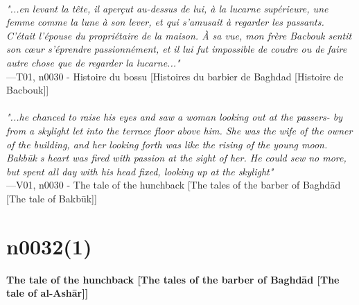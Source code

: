 \documentclass[../Carre_nights.tex]{subfiles}
\begin{document}
\textit{\\
"...en levant la tête, il aperçut au-dessus de lui, à la lucarne supérieure, une femme comme la lune à son lever, et qui s’amusait à regarder les passants. C’était l’épouse du propriétaire de la maison. À sa vue, mon frère Bacbouk sentit son cœur s’éprendre passionnément, et il lui fut impossible de coudre ou de faire autre chose que de regarder la lucarne..."} \\
—T01, n0030 - Histoire du bossu [Histoires du barbier de Baghdad [Histoire de Bacbouk]] \\~\\
\textit{"...he chanced to raise his eyes and saw a woman looking out at the passers- by from a skylight let into the terrace floor above him. She was the wife of the owner of the building, and her looking forth was like the rising of the young moon. Bakb\=uk s heart was fired with passion at the sight of her. He could sew no more, but spent all day with his head fixed, looking up at the skylight"} \\
—V01, n0030 - The tale of the hunchback [The tales of the barber of Baghd\=ad [The tale of Bakb\=uk]]

\newpage

\section{n0032(1)}
\textbf{\Large{The tale of the hunchback [The tales of the barber of Baghd\=ad [The tale of al-Ash\=ar]]}} \\
\end{document}
